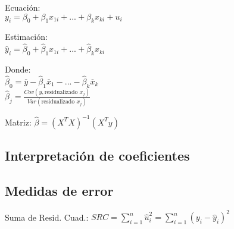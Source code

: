 \documentclass[10pt, a4paper, landscape]{extarticle}
\begin{document}
\begin{multicols}{3}
\begin{multicols}{2}
\columnbreak

Ecuación: \\ $y_i = \beta_0 + \beta_1 x_{1i} + ... + \beta_k x_{ki} + u_i$

\vspace*{1mm}

Estimación: \\ $\hat{y}_i = \hat{\beta}_0 + \hat{\beta}_1 x_{1i} + ... + \hat{\beta}_k x_{ki}$

\vspace*{1mm}

Donde: \\ $\hat{\beta}_0 = \overline{y} - \hat{\beta}_1 \overline{x}_1 - ... - \hat{\beta}_k \overline{x}_k$ \\ $\hat{\beta}_j = \frac{Cov(y, \text{residualizado } x_j)}{Var(\text{residualizado } x_j)}$

\vspace*{1mm}

Matriz: $\hat{\beta} = (X^T X)^{-1} (X^T y)$

\end{multicols}

\subsection*{Interpretación de coeficientes}


\subsection*{Medidas de error}

Suma de Resid. Cuad.: \hfill $SRC = \sum_{i=1}^n \hat{u}_i^2 = \sum_{i=1}^n (y_i - \hat{y}_i)^2$


\end{multicols}
\end{document}
